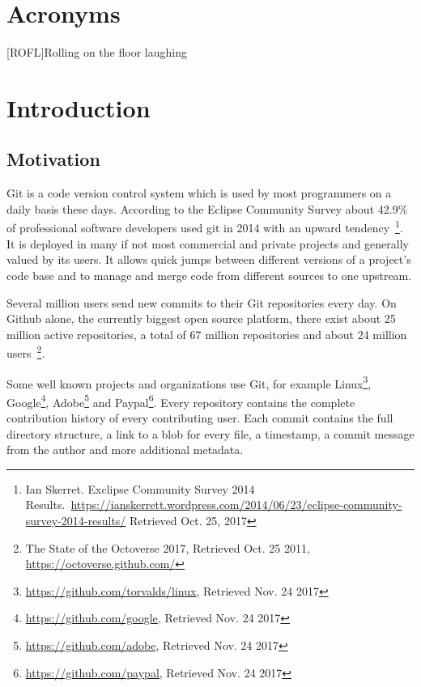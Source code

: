 \documentclass{thesis}
\begin{document}
{\small \tableofcontents}



\chapter*{Acronyms}
\begin{acronym}
    [ROFL]{Rolling on the floor laughing}
\end{acronym}

\chapter{Introduction}



\section{Motivation}

Git is a code version control system which is used by most programmers on a daily basis these days. According to the Eclipse Community Survey about 42.9\% of professional software developers used git in 2014 with an upward tendency~\footnote{Ian Skerret. Exclipse Community Survey 2014 Results.\ \url{https://ianskerrett.wordpress.com/2014/06/23/eclipse-community-survey-2014-results/} Retrieved Oct. 25, 2017}.
It is deployed in many if not most commercial and private projects and generally valued by its users. It allows quick jumps between different versions of a project's code base and to manage and merge code from different sources to one upstream.

Several million users send new commits to their Git repositories every day.
On Github alone, the currently biggest open source platform, there exist about 25 million active repositories, a total of 67 million repositories and about 24 million users~\footnote{The State of the Octoverse 2017, Retrieved Oct. 25 2011, \url{https://octoverse.github.com/}}.

Some well known projects and organizations use Git, for example Linux\footnote{\url{https://github.com/torvalds/linux}, Retrieved Nov. 24 2017}, Google\footnote{\url{https://github.com/google}, Retrieved Nov. 24 2017}, Adobe\footnote{\url{https://github.com/adobe}, Retrieved Nov. 24 2017} and Paypal\footnote{\url{https://github.com/paypal}, Retrieved Nov. 24 2017}.
Every repository contains the complete contribution history of every contributing user.
Each commit contains the full directory structure, a link to a blob for every file, a timestamp, a commit message from the author and more additional metadata.
\end{document}
